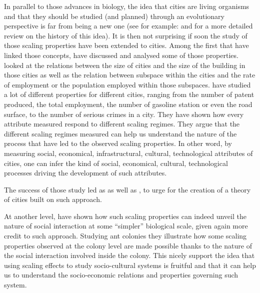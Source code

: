 \documentclass[a4paper,11pt]{article}
\begin{document}
In parallel to those advances in biology, the idea that cities are living organisms and that they should be studied (and planned) through an evolutionary perspective is far from being a new  one (see for example: \cite{geddes1915citiesinevolution} and  \cite{batty2009theevolutionofcitiesgeddesabercrombieandthenewphysicalism} for a more detailed review on the history of this idea). It is then not surprising if soon the study of those scaling properties have been extended to cities.
Among the first that have linked those concepts, \cite{batty2008thesizescaleandshapeofcities,bettencourt2007growthinnovationscalingandthepaceoflifeincities} have discussed and analysed some of those properties. \cite{batty2008thesizescaleandshapeofcities} looked at the relations between the size of cities and the size of the building in those cities as well as the relation between subspace within the cities and the rate of employment or the population employed within those subspaces.
\cite{bettencourt2007growthinnovationscalingandthepaceoflifeincities} have studied a lot of different properties for different cities, ranging from the number of patent produced, the total employment, the number of gasoline station or even the road surface, to the number of serious crimes in a city. They have shown how every attribute measured respond to different scaling regimes.  They argue that the different scaling regimes measured can help us understand the nature of the process that have led to the observed scaling properties. In other word, by measuring social, economical, infrastructural, cultural, technological attributes of cities, one can infer the kind of social, economical, cultural, technological processes driving the development of such attributes.

The success of those study led \cite{bettencourt2010aunifiedtheoryofurbanliving} as as well as \cite{batty2013theory}, to urge for the creation of a theory of cities built on such approach.

At another level, \cite{hou2010energeticbasisofcoloniallivinginsocialinsects} have shown how such scaling properties can indeed unveil the nature of social interaction at some ``simpler'' biological scale, given again more credit to such approach.
Studying ant colonies they illustrate how some scaling properties observed at the colony level are made possible thanks to the nature of the social interaction involved inside the colony.
This nicely support the idea that using scaling effects to study socio-cultural systems is fruitful and that it can help us to understand the socio-economic relations and properties governing such system. 
\end{document}
